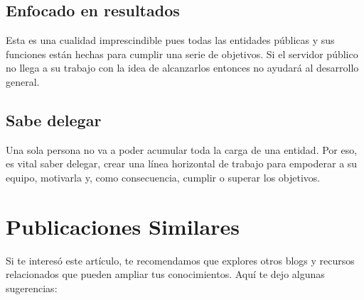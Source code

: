 \documentclass[
  jou,
  floatsintext,
  longtable,
  a4paper,
  nolmodern,
  notxfonts,
  notimes,
  colorlinks=true,linkcolor=blue,citecolor=blue,urlcolor=blue]{apa7}
\begin{document}
\subsection{Enfocado en resultados}\label{enfocado-en-resultados}

Esta es una cualidad imprescindible pues todas las entidades públicas y
sus funciones están hechas para cumplir una serie de objetivos. Si el
servidor público no llega a su trabajo con la idea de alcanzarlos
entonces no ayudará al desarrollo general.

\subsection{Sabe delegar}\label{sabe-delegar}

Una sola persona no va a poder acumular toda la carga de una entidad.
Por eso, es vital saber delegar, crear una línea horizontal de trabajo
para empoderar a su equipo, motivarla y, como consecuencia, cumplir o
superar los objetivos.

\section{Publicaciones Similares}\label{publicaciones-similares}

Si te interesó este artículo, te recomendamos que explores otros blogs y
recursos relacionados que pueden ampliar tus conocimientos. Aquí te dejo
algunas sugerencias:
\end{document}
